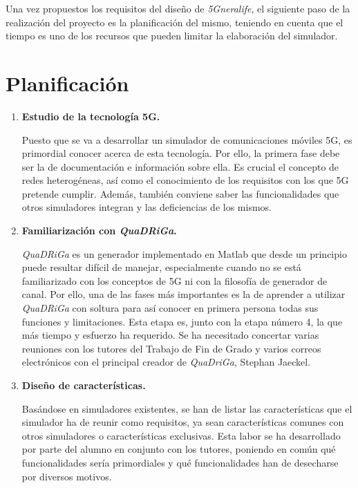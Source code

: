 Una vez propuestos los requisitos del diseño de \textit{5Gneralife}, el siguiente paso de la realización del proyecto es la planificación del mismo, teniendo en cuenta que el tiempo es uno de los recursos que pueden limitar la elaboración del simulador.

\section{Planificación}
 \begin{enumerate}
     \item \textbf{Estudio de la tecnología 5G.}
     
        Puesto que se va a desarrollar un simulador de comunicaciones móviles 5G, es primordial conocer acerca de esta tecnología. Por ello, la primera fase debe ser la de documentación e información sobre ella. Es crucial el concepto de redes heterogéneas, así como el conocimiento de los requisitos con los que 5G pretende cumplir. Además, también conviene saber las funcionalidades que otros simuladores integran y las deficiencias de los mismos.
     
     \item \textbf{Familiarización con \textit{QuaDRiGa}.}
     
        \textit{QuaDRiGa} es un generador implementado en Matlab que desde un principio puede resultar difícil de manejar, especialmente cuando no se está familiarizado con los conceptos de 5G ni con la filosofía de generador de canal. Por ello, una de las fases más importantes es la de aprender a utilizar \textit{QuaDRiGa} con soltura para así conocer en primera persona todas sus funciones y limitaciones. Esta etapa es, junto con la etapa número 4, la que más tiempo y esfuerzo ha requerido. Se ha necesitado concertar varias reuniones con los tutores del Trabajo de Fin de Grado y varios correos electrónicos con el principal creador de \textit{QuaDriGa}, Stephan Jaeckel.
     
     \item \textbf{Diseño de características.}
     
        Basándose en simuladores existentes, se han de listar las características que el simulador ha de reunir como requisitos, ya sean características comunes con otros simuladores o características exclusivas. Esta labor se ha desarrollado por parte del alumno en conjunto con los tutores, poniendo en común qué funcionalidades sería primordiales y qué funcionalidades han de desecharse por diversos motivos.
     

\end{enumerate}
